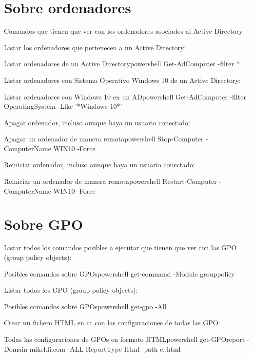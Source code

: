 \section{Sobre ordenadores}
Comandos que tienen que ver con los ordenadores asociados al Active Directory.

Listar los ordenadores que pertenecen a un Active Directory:
\begin{mycode}{Listar ordenadores de un Active Directory}{powershell}{}
Get-AdComputer -filter *
\end{mycode}


Listar ordenadores con Sistema Operativo Windows 10 de un Active Directory:
\begin{mycode}{Listar ordenadores con Windows 10 en un AD}{powershell}{}
Get-AdComputer -filter  {OperatingSystem -Like '*Windows 10*'}
\end{mycode}


Apagar ordenador, incluso aunque haya un usuario conectado:
\begin{mycode}{Apagar un ordenador de manera remota}{powershell}{}
Stop-Computer -ComputerName WIN10 -Force
\end{mycode}

Reiniciar ordenador, incluso aunque haya un usuario conectado:
\begin{mycode}{Reiniciar un ordenador de manera remota}{powershell}{}
Restart-Computer -ComputerName WIN10 -Force
\end{mycode}

\section{Sobre GPO}
Listar todos los comandos posibles a ejecutar que tienen que ver con las GPO (group policy objects):
\begin{mycode}{Posibles comandos sobre GPOs}{powershell}{}
get-command -Module grouppolicy
\end{mycode}


Listar todos los GPO (group policy objects):
\begin{mycode}{Posibles comandos sobre GPOs}{powershell}{}
get-gpo -All
\end{mycode}

Crear un fichero HTML en c:\  con las configuraciones de todas las GPO:
\begin{mycode}{Todas las configuraciones de GPOs en formato HTML}{powershell}{}
get-GPOreport -Domain mikeldi.com -ALL ReportType Html -path c:\gpo.html
\end{mycode}

